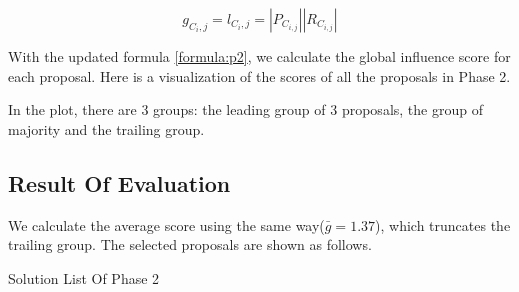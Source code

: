 \begin{equation}
g_{C_{i},j} = l_{C_{i},j} = |P_{C_{i,j}}| |R_{C_{i,j}}|
\label{formula:p2}
\end{equation}

With the updated formula \ref{formula:p2}, we calculate the global influence score for each proposal. Here is a visualization of the scores of all the proposals in Phase 2.

In the plot, there are 3 groups: the leading group of 3 proposals, the group of majority and the trailing group.

\begin{figure}[ht]
\centering
{}
\end{figure}
\subsection{Result Of Evaluation}
We calculate the average score using the same way($\bar{g}=1.37$), which truncates the trailing group. The selected proposals are shown as follows.

\begin{table}[ht]
\caption{Solution List Of Phase 2}
\label{tab:solution2}
\end{table}
